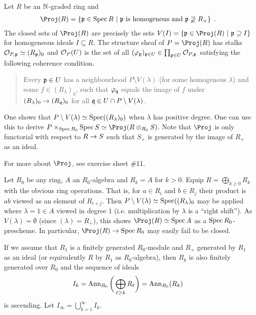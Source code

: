 \documentclass[a4paper,parskip=half,numbers=enddot, DIV=12]{scrreprt}
\begin{document}
\begin{example}
    Let $R$ be an $\mathbb{N}$-graded ring and 
    \begin{align*}
        \Proj(R) = \left\{\pp\in\Spec R \st \pp \text{ is homogenous and } \pp\not \supseteq R_+\right\}\;.
    \end{align*}
    The closed sets of $\Proj(R)$ are precisely the sets $V(I)=\left\{\pp\in\Proj(R)\st \pp\supseteq I\right\}$ for homogeneous ideals $I\subseteq R$. The structure sheaf of $P=\Proj (R)$ has stalks $\mathcal{O}_{P,\mathfrak{p}} \simeq (R_{\mathfrak{p}})_0$ and $\mathcal{O}_P(U)$ is the set of all $(\varphi_{\mathfrak{p}})_{\mathfrak{p}\in U}\in \prod_{\mathfrak{p}\in U} \mathcal{O}_{P,\mathfrak{p}}$ satisfying the following coherence condition. 
    \begin{quote}
    	Every $\mathfrak{p}\in U$ has a neighbourhood $P\setminus V(\lambda)$ (for some homogenous $\lambda$) and some $f\in (R_\lambda)_0$, such that $\varphi_{\mathfrak{q}}$ equals the image of $f$ under $(R_\lambda)_0 \morphism (R_\qq)_0$ for all $\mathfrak{q}\in U\cap P\setminus V(\lambda)$. 
    \end{quote}
    One shows that $P\setminus V(\lambda) \simeq \operatorname{Spec}((R_\lambda)_0)$ when $\lambda$ has positive degree. One can use this to derive $P\times_{\Spec R_0} \Spec S \simeq \Proj(R\otimes_{R_0} S)$. Note that $\Proj$ is only functorial with respect to $R\morphism S$ such that $S_+$ is generated by the image of $R_+$ as an ideal.
    
    For more about $\Proj$, see exercise sheet \#11.
\end{example}
\begin{example}
    Let $R_0$ be any ring, $A$ an $R_0$-algebra and $R_k = A$ for $k>0$. Equip $R=\bigoplus_{k\geq 0}R_k$ with the obvious ring operations. That is, for $a\in R_i$ and $b\in R_j$ their product is $ab$ viewed as an element of $R_{i+j}$. Then $P\setminus V(\lambda) \simeq \operatorname{Spec}((R_\lambda)_0$ may be applied where $\lambda = 1\in A$ viewed in degree $1$ (i.e. multiplication by $\lambda$ is a ``right shift''). As $V(\lambda)=\emptyset$ (since $(\lambda)=R_+$), this shows $\Proj(R)\simeq \Spec A$ as a $\operatorname{Spec} R_0$-prescheme. In particular, $\Proj(R)\morphism \Spec R_0$ may easily fail to be closed.
\end{example}
If we assume that $R_1$ is a finitely generated $R_0$-module and $R_+$ generated by $R_1$ as an ideal (or equivalently $R$ by $R_1$ as $R_0$-algebra), then $R_k$ is also finitely generated over $R_0$ and the sequence of ideals 
\begin{align*}
    I_k = \operatorname{Ann}_{R_0}\bigg(\bigoplus_{\ell\geq k} R_\ell\bigg) = \operatorname{Ann}_{R_0} (R_k)
\end{align*}
is ascending. Let $I_\infty = \bigcup_{k=1}^\infty I_k$.
\end{document}
